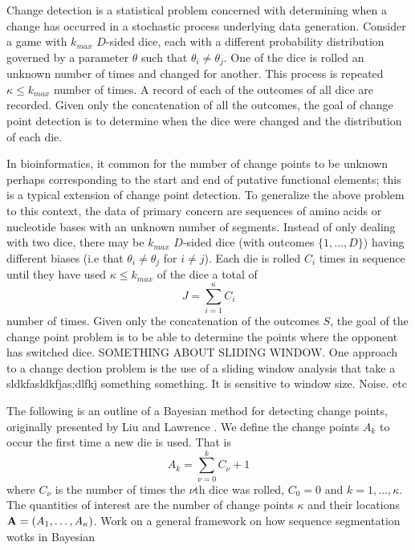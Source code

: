 Change detection is a statistical problem concerned with determining when a change has occurred in a stochastic process underlying data generation. 
Consider a game with $k_{max}$ $D$-sided dice, each with a different probability distribution governed by a parameter $\theta$ such that $\theta_i \neq \theta_j$. One of the dice is rolled an unknown number of times and changed for another. This process is repeated $\kappa \leq k_{max}$ number of times. A record of each of the outcomes of all dice are recorded. Given only the concatenation of all the outcomes, the goal of change point detection is to determine when the dice were changed and the distribution of each die. 

In bioinformatics, it common for the number of change points to be unknown {\color{red}perhaps corresponding to the start and end of putative functional elements}; this is a typical extension of change point detection. To generalize the above problem to this context, the data of primary concern are sequences of amino acids or nucleotide bases with an unknown number of segments. 
Instead of only dealing with two dice, there may be $k_{max}$ $D$-sided dice (with outcomes $\{1,\ldots,D\}$) having different biases (i.e that $\theta_i\neq \theta_j$ for $i\neq j$). Each die is rolled $C_i$ times in sequence until they have used $\kappa\leq k_{max}$ of the dice a total of 
    \begin{equation}
        J = \sum_{i=1}^{\kappa}C_i
    \end{equation}
number of times. Given only the concatenation of the outcomes $S$, the goal of the change point problem is to be able to determine the points where the opponent has switched dice.
{\color{red}SOMETHING ABOUT SLIDING WINDOW. One approach to a change dection problem is the use of a sliding window analysis that take a sldkfasldkfjas;dlfkj something something. It is sensitive to window size. Noise. etc}

The following is an outline of a Bayesian method for detecting change points, originally presented by Liu and Lawrence \cite{liu1999bayesian}. We define the change points $A_k$ to occur the first time a new die is used. That is
    \begin{equation}
        A_k = \sum_{\nu=0}^{k}C_\nu + 1
    \end{equation}
where $C_\nu$ is the number of times the $\nu$th dice was rolled, $C_0 = 0$ and $k = 1,\ldots,\kappa$. The quantities of interest are the number of change points $\kappa$ and their locations $\mathbf{A} = (A_1,\ldots,A_\kappa)$. {\color{red} Work on a general framework on how sequence segmentation wotks in Bayesian}

